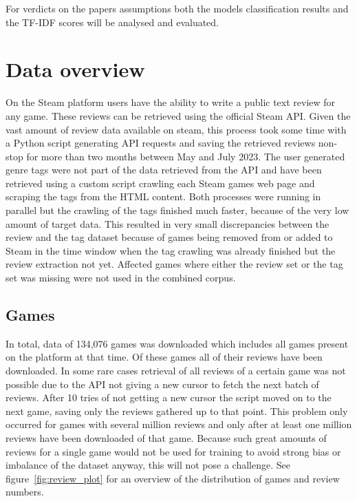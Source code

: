 \documentclass[11pt, a4paper]{article}
\begin{document}
For verdicts on the papers assumptions both the models classification results and the TF-IDF scores will be analysed
and evaluated.


\section{Data overview}\label{sec:data-overview}
On the Steam platform users have the ability to write a public text review for any game.
These reviews can be retrieved using the official Steam API.
Given the vast amount of review data available on steam, this process took some time with a Python script generating
API requests and saving the retrieved reviews non-stop for more than two months between May and July 2023.
The user generated genre tags were not part of the data retrieved from the API and have been retrieved using a custom
script crawling each Steam games web page and scraping the tags from the HTML content.
Both processes were running in parallel but the crawling of the tags finished much faster, because of the very low
amount of target data.
This resulted in very small discrepancies between the review and the tag dataset because of games being removed from
or added to Steam in the time window when the tag crawling was already finished but the review extraction not yet.
Affected games where either the review set or the tag set was missing were not used in the combined corpus.

\subsection{Games}\label{subsec:games}
In total, data of 134,076 games was downloaded which includes all games present on the platform at that time.
Of these games all of their reviews have been downloaded.
In some rare cases retrieval of all reviews of a certain game was not possible due to the API not giving a new cursor
to fetch the next batch of reviews.
After 10 tries of not getting a new cursor the script moved on to the next game, saving only the reviews gathered up
to that point.
This problem only occurred for games with several million reviews and only after at least one million reviews have
been downloaded of that game.
Because such great amounts of reviews for a single game would not be used for training to avoid strong bias or
imbalance of the dataset anyway, this will not pose a challenge.
See figure~\ref{fig:review_plot} for an overview of the distribution of games and review numbers.
\end{document}
